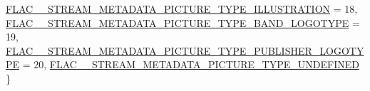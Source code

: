 \begin{DoxyCompactItemize}
\hyperlink{group__flac__format_ggaf6d3e836cee023e0b8d897f1fdc9825da89ba412c9d89c937c28afdab508d047a}{F\+L\+A\+C\+\_\+\+\_\+\+S\+T\+R\+E\+A\+M\+\_\+\+M\+E\+T\+A\+D\+A\+T\+A\+\_\+\+P\+I\+C\+T\+U\+R\+E\+\_\+\+T\+Y\+P\+E\+\_\+\+I\+L\+L\+U\+S\+T\+R\+A\+T\+I\+ON} = 18, 
\hyperlink{group__flac__format_ggaf6d3e836cee023e0b8d897f1fdc9825da751716a4528a78a8d53f435c816c4917}{F\+L\+A\+C\+\_\+\+\_\+\+S\+T\+R\+E\+A\+M\+\_\+\+M\+E\+T\+A\+D\+A\+T\+A\+\_\+\+P\+I\+C\+T\+U\+R\+E\+\_\+\+T\+Y\+P\+E\+\_\+\+B\+A\+N\+D\+\_\+\+L\+O\+G\+O\+T\+Y\+PE} = 19, 
\newline
\hyperlink{group__flac__format_ggaf6d3e836cee023e0b8d897f1fdc9825da31d75150a4079482fe122e703eff9141}{F\+L\+A\+C\+\_\+\+\_\+\+S\+T\+R\+E\+A\+M\+\_\+\+M\+E\+T\+A\+D\+A\+T\+A\+\_\+\+P\+I\+C\+T\+U\+R\+E\+\_\+\+T\+Y\+P\+E\+\_\+\+P\+U\+B\+L\+I\+S\+H\+E\+R\+\_\+\+L\+O\+G\+O\+T\+Y\+PE} = 20, 
\hyperlink{group__flac__format_ggaf6d3e836cee023e0b8d897f1fdc9825dae294ac8c7865c196fc52440fbbca9ad1}{F\+L\+A\+C\+\_\+\+\_\+\+S\+T\+R\+E\+A\+M\+\_\+\+M\+E\+T\+A\+D\+A\+T\+A\+\_\+\+P\+I\+C\+T\+U\+R\+E\+\_\+\+T\+Y\+P\+E\+\_\+\+U\+N\+D\+E\+F\+I\+N\+ED}
 \}
\end{DoxyCompactItemize}
